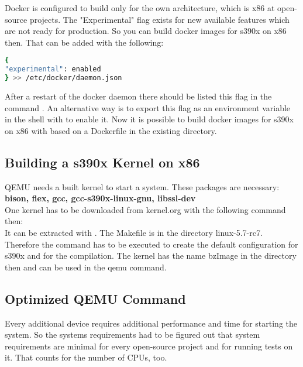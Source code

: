 Docker is configured to build only for the own architecture, which is x86 at open-source projects. The "Experimental" flag exists for new available features which are not ready for production. So you can build docker images for s390x on x86 then. That can be added with the following:

\begin{lstlisting}[language=Bash,caption={This is an example of inline listing},captionpos=b]
{
"experimental": enabled
} >> /etc/docker/daemon.json
\end{lstlisting}

After a restart of the docker daemon there should be listed this flag in the command . An alternative way is to export this flag as an environment variable in the shell with  to enable it. Now it is possible to build docker images for s390x on x86 with  based on a Dockerfile in the existing directory.

 

 

\subsection{Building a s390x Kernel on x86}

QEMU needs a built kernel to start a system. These packages are necessary: \\
\textbf{bison, flex, gcc, gcc-s390x-linux-gnu, libssl-dev} \\
One kernel has to be downloaded from kernel.org with the following command then: \\
It can be extracted with . The Makefile is in the directory linux-5.7-rc7. Therefore the command  has to be executed to create the default configuration for s390x and  for the compilation. The kernel has the name bzImage in the directory  then and can be used in the qemu command.

\subsection{Optimized QEMU Command}

Every additional device requires additional performance and time for starting the system. 
So the systems requirements had to be figured out that system requirements are minimal for every open-source project and for running tests on it. 
That counts for the number of CPUs, too. \\

